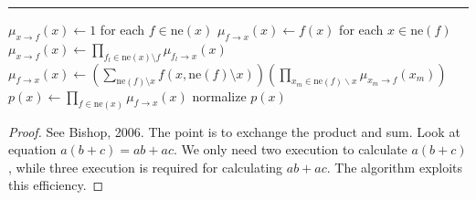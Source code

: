 \documentclass{article}
\begin{document}
        \begin{algorithm}[H]
            \DontPrintSemicolon

            \caption{Sum-product algorithm (belief propagation)}


            \BlankLine
            \hrule

            {
                {
                    $\mu_{x \to f}(x) \leftarrow 1$ for each $f \in \text{ne}(x)$\;
                }
                {
                    $\mu_{f \to x}(x) \leftarrow f(x)$ for each $x \in \text{ne}(f)$\;
                }
            }
            {
                {
                    {
                        $\mu_{x \to f}(x) \leftarrow \prod_{f_l \in \text{ne}(x) \setminus f}\mu_{f_l \to x}(x)$
                    }
                }
                {
                    {
                        $\mu_{f \to x}(x) \leftarrow \left(\sum_{\text{ne}(f) \setminus x} f(x, \text{ne}(f) \setminus x)\right) \left(\prod_{x_m \in \text{ne}(f) \backslash x}\mu_{x_m \to f}(x_m)\right)$
                    }
                }
            }
            {
                $p(x) \leftarrow \prod_{f \in \text{ne}(x)}\mu_{f \to x}(x)$\;
                normalize $p(x)$\;
            }
        \end{algorithm}

        \begin{proof}
            See Bishop, 2006. The point is to exchange the product and sum. Look at equation $a(b+c) = ab+ac$.
            We only need two execution to calculate $a(b+c)$, while three execution is required for calculating $ab + ac$.
            The algorithm exploits this efficiency.
        \end{proof}
\end{document}
